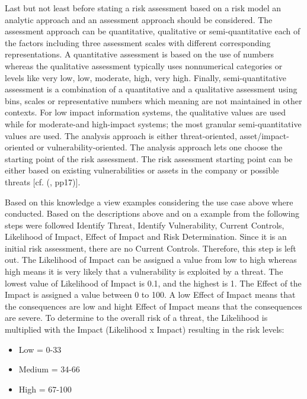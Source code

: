 Last but not least before stating a risk assessment based on a risk model an analytic approach and an assessment approach should be considered. The assessment approach can be quantitative, qualitative or semi-quantitative each of the factors including three assessment scales with different corresponding representations. A quantitative assessment is based on the use of numbers whereas the qualitative assessment typically uses nonnumerical categories or levels like very low, low, moderate, high, very high. Finally, semi-quantitative assessment is a combination of a quantitative and a qualitative assessment using bins, scales or representative numbers which meaning are not maintained in other contexts. For low impact information systems, the qualitative values are used while for moderate-and high-impact systems; the most granular semi-quantitative values are used. The analysis approach is either threat-oriented, asset/impact-oriented or vulnerability-oriented. The analysis approach lets one choose the starting point of the risk assessment. The risk assessment starting point can be either based on existing vulnerabilities or assets in the company or possible threats  [cf. (\cite{NIST:2012:GCRA}, pp17)].

Based on this knowledge a view examples considering the use case above where conducted. Based on the descriptions above and on a example from \cite{Hudson:2015:SecurityRisk}  the following steps were followed  Identify Threat, Identify Vulnerability, Current Controls, Likelihood of Impact, Effect of Impact and Risk Determination. Since it is an initial risk assessment, there are no Current Controls. Therefore, this step is left out. The Likelihood of Impact can be assigned a value from low to high whereas high means it is very likely that a vulnerability is exploited by a threat. The lowest value of Likelihood of Impact is 0.1, and the highest is 1. The Effect of the Impact is assigned a value between 0 to 100. A low Effect of Impact means that the consequences are low and hight Effect of Impact means that the consequences are severe. To determine to the overall risk of a threat, the Likelihood is multiplied with the Impact (Likelihood x Impact) resulting in the risk levels:

\begin{itemize}
	\item Low =     0-33
	\item Medium = 34-66
	\item High =   67-100
\end{itemize}

